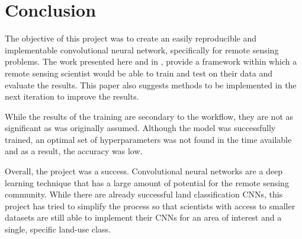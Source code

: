 \chapter{Conclusion}
The objective of this project was to create an easily reproducible and implementable convolutional neural network, specifically for remote sensing problems. The work presented here and in \citet{Richmond19b}, provide a framework within which a remote sensing scientist would be able to train and test on their data and evaluate the results. This paper also suggests methods to be implemented in the next iteration to improve the results. 
\par
While the results of the training are secondary to the workflow, they are not as significant as was originally assumed. Although the model was successfully trained, an optimal set of hyperparameters was not found in the time available and as a result, the accuracy was low.
\par
Overall, the project was a success. Convolutional neural networks are a deep learning technique that has a large amount of potential for the remote sensing community. While there are already successful land classification CNNs, this project has tried to simplify the process so that scientists with access to smaller datasets are still able to implement their CNNs for an area of interest and a single, specific land-use class.